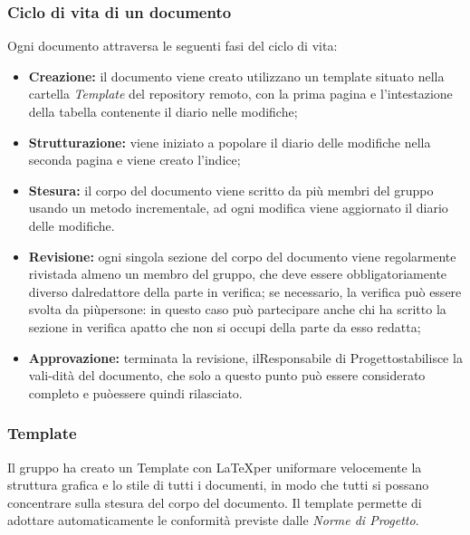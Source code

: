         \subsubsection{Ciclo di vita di un documento}
        Ogni documento attraversa le seguenti fasi del ciclo di vita:
        \begin{itemize}
            \item \textbf{Creazione:} il documento viene creato utilizzano un template situato nella cartella \textit{Template} del repository remoto, con la prima pagina e l'intestazione della tabella contenente il diario nelle modifiche;
            \item \textbf{Strutturazione:} viene iniziato a popolare il diario delle modifiche nella seconda pagina e viene creato l'indice;
            \item \textbf{Stesura:} il corpo del documento viene scritto da più membri del gruppo usando un metodo incrementale, ad ogni modifica viene aggiornato il diario delle modifiche.
            \item \textbf{Revisione:} ogni singola sezione del corpo del documento viene regolarmente rivistada almeno un membro del gruppo, che deve essere obbligatoriamente diverso dalredattore della parte in verifica; se necessario, la verifica può essere svolta da piùpersone: in questo caso può partecipare anche chi ha scritto la sezione in verifica apatto che non si occupi della parte da esso redatta;
            \item \textbf{Approvazione:} terminata la revisione, ilResponsabile di Progettostabilisce la vali-dità del documento, che solo a questo punto può essere considerato completo e puòessere quindi rilasciato.
        \end{itemize}
        \subsubsection{Template}
        Il gruppo ha creato un Template con \LaTeX per uniformare velocemente la struttura grafica e lo stile di tutti i documenti, in modo che tutti si possano concentrare sulla stesura del corpo del documento. Il template permette di adottare automaticamente le conformità previste dalle \textit{Norme di Progetto}.

